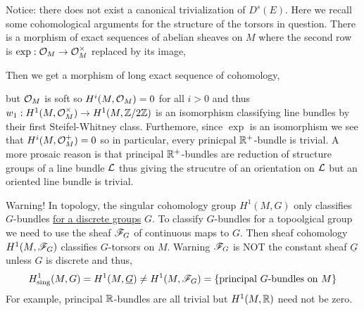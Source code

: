 \documentclass[12pt]{article}
\begin{document}
\begin{rmk}
Notice: there does not exist a canonical trivialization of $D^s(E)$. Here we recall some cohomological arguments for the structure of the torsors in question. There is a morphism of exact sequences of abelian sheaves on $M$ where the second row is $\exp : \mathcal{O}_{M} \to \mathcal{O}_{M}^\times$ replaced by its image,
\begin{center}
\end{center}
Then we get a morphism of long exact sequence of cohomology,
\begin{center}
\end{center}
but $\mathcal{O}_{M}$ is soft so $H^i(M, \mathcal{O}_{M}) = 0$ for all $i > 0$ and thus $w_1 : H^1(M, \mathcal{O}_{M}^\times) \to H^1(M, \mathbb{Z} / 2 \mathbb{Z})$ is an isomorphism classifying line bundles by their first Steifel-Whitney class. Furthemore, since $\exp$ is an isomorphism we see that $H^i(M, \mathcal{O}_{M}^+) = 0$ so in particular, every prinicpal $\mathbb{R}^+$-bundle is trivial. A more prosaic reason is that principal $\mathbb{R}^+$-bundles are reduction of structure groups of a line bundle $\mathcal{L}$ thus giving the strucutre of an orientation on $\mathcal{L}$ but an oriented line bundle is trivial. 
\end{rmk}

\begin{rmk}
Warning! In topology, the singular cohomology group $H^1(M, G)$ only classifies $G$-bundles \underline{for a discrete groups} $G$. To classify $G$-bundles for a topoolgical group we need to use the sheaf $\mathscr{F}_G$ of continuous maps to $G$. Then sheaf cohomology $H^1(M, \mathscr{F}_G)$ classifies $G$-torsors on $M$. Warning $\mathscr{F}_G$ is NOT the constant sheaf $\underline{G}$ unless $G$ is discrete and thus,
\[ H^1_{\text{sing}}(M, G) = H^1(M, \underline{G}) \neq H^1(M, \mathscr{F}_G) = \{ \text{principal } G \text{-bundles on } M \} \]
For example, principal $\mathbb{R}$-bundles are all trivial but $H^1(M, \mathbb{R})$ need not be zero.
\end{rmk}
\end{document}
